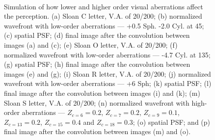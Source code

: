 
\begin{figure}[h]
	\centering

	\subfigure[]{
		\texttt{[image: ]}
	}
	~
	\subfigure[]{
		\texttt{[image: ]}
	}
	~
	\subfigure[]{
		\texttt{[image: ]}
	}
	~
	\subfigure[]{
		\texttt{[image: ]}
	}
	\subfigure[]{
		\texttt{[image: ]}
	}
	~
	\subfigure[]{
		\texttt{[image: ]}
	}
	~
	\subfigure[]{
		\texttt{[image: ]}
	}
	~
	\subfigure[]{
		\texttt{[image: ]}
	}
	\subfigure[]{
		\texttt{[image: ]}
	}
	~
	\subfigure[]{
		\texttt{[image: ]}
	}
	~
	\subfigure[]{
		\texttt{[image: ]}
	}
	~
	\subfigure[]{
		\texttt{[image: ]}
	}
	\subfigure[]{
		\texttt{[image: ]}
	}
	~
	\subfigure[]{
		\texttt{[image: ]}
	}
	~
	\subfigure[]{
		\texttt{[image: ]}
	}
	~
	\subfigure[]{
		\texttt{[image: ]}
	}
	\caption[Simulation of how lower and higher order visual aberrations affect the perception]{Simulation of how lower and higher order visual aberrations affect the perception. (a) Sloan C letter, V.A. of 20/200; (b) normalized wavefront with low-order aberrations --- +0.5 Sph. -2.0 Cyl. at 45; (c) spatial PSF; (d) final image after the convolution between images (a) and (c); (e) Sloan O letter, V.A. of 20/200; (f) normalized wavefront with low-order aberrations --- -4.7 Cyl. at 135; (g) spatial PSF; (h) final image after the convolution between images (e) and (g); (i) Sloan R letter, V.A. of 20/200; (j) normalized wavefront with low-order aberrations --- +6 Sph; (k) spatial PSF; (l) final image after the convolution between images (i) and (k); (m) Sloan S letter, V.A. of 20/200; (n) normalized wavefront with high-order aberrations --- $Z_{c=6}=0.2$, $Z_{c=7}=0.2$, $Z_{c=9}=0.1$, $Z_{c=13}=0.2$, $Z_{c=15}=0.4$ and $Z_{c=18}=0.3$; (o) spatial PSF; and (p) final image after the convolution between images (m) and (o).}
	\label{fig:synthetic_sims}
\end{figure}

\clearpage
